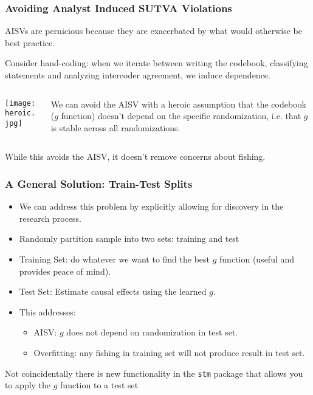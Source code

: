 \documentclass[xcolor=dvipsnames]{beamer}
\begin{document}
\begin{frame}
\frametitle{Avoiding Analyst Induced SUTVA Violations}

AISVs are pernicious because they are exacerbated by what would otherwise be best practice. \pause

\medskip

Consider hand-coding: when we iterate between writing the codebook, classifying statements and analyzing intercoder agreement, we induce \alert{dependence}. \pause

\medskip

\begin{columns}[c]
\begin{column}{.35\textwidth}
\begin{center}
\texttt{[image: heroic.jpg]}
\end{center}
\end{column}
\begin{column}{.65\textwidth}
We can avoid the AISV with a \alert{heroic} assumption that the codebook ($g$ function) doesn't depend on the specific randomization, i.e. that $g$ is \alert{stable} across all randomizations.
\end{column}
\end{columns}
\pause

\medskip

While this avoids the AISV, it doesn't remove concerns about \alert{fishing}.
\end{frame}

\begin{frame}
\frametitle{A General Solution: Train-Test Splits}

\pause
\begin{itemize}
\item We can address this problem by explicitly allowing for \alert{discovery} in the research process. \pause
\item Randomly partition sample into two sets: \alert{training} and \alert{test} \pause
\item \alert{Training Set}: do whatever we want to find the best $g$ function (useful and provides peace of mind).   \pause
\item \alert{Test Set}: Estimate causal effects using the learned $g$. \pause
\item This addresses:
\begin{itemize}
\item \alert{AISV}: $g$ does not depend on randomization in test set. \pause
\item \alert{Overfitting}: any fishing in training set will not produce result in test set.  \pause
\end{itemize}
\end{itemize}

\medskip

{\small Not coincidentally there is new functionality in the \texttt{stm} package that allows you to apply the $g$ function to a test set}
\end{frame}
\end{document}
